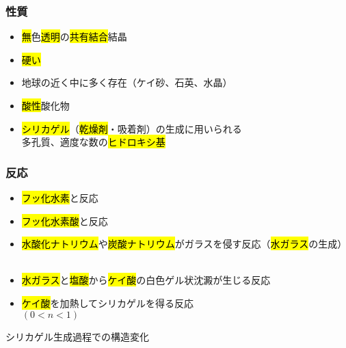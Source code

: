  \subsubsection{性質}
 \begin{itemize}
  \item \hl{無}色\hl{透明}の\hl{共有結合}結晶
  \item \hl{硬い}
  \item 地球の近く中に多く存在（ケイ砂、石英、水晶）
  \item \hl{酸性}酸化物
  \item \hl{シリカゲル}（\hl{乾燥剤}・吸着剤）の生成に用いられる\\
  多孔質、適度な数の\hl{ヒドロキシ基}
 \end{itemize}
 \subsubsection{反応}
 \begin{itemize}
  \item \hl{フッ化水素}と反応\\
  \item \hl{フッ化水素酸}と反応\\
  \item \hl{水酸化ナトリウム}や\hl{炭酸ナトリウム}がガラスを侵す反応（\hl{水ガラス}の生成）\\
  \\
  \item \hl{水ガラス}と\hl{塩酸}から\hl{ケイ酸}の白色ゲル状沈澱が生じる反応\\
  \item \hl{ケイ酸}を加熱してシリカゲルを得る反応\\
   $(0<n<1)$
 \end{itemize}
\newpage
{\Large \gtfamily シリカゲル生成過程での構造変化}
